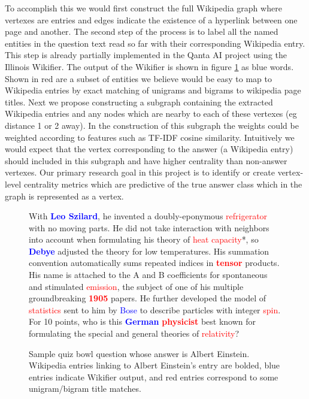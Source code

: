 \documentclass[11pt]{article}
\begin{document}
To accomplish this we would first construct the full Wikipedia graph where vertexes are entries and edges indicate the existence of a hyperlink between one page and another. The second step of the process is to label all the named entities in the question text read so far with their corresponding Wikipedia entry. This step is already partially implemented in the Qanta AI project\cite{Qanta} using the Illinois Wikifier\cite{RRDA11, ChengRo13}. The output of the Wikifier is shown in figure \ref{qb-question} as blue words. Shown in red are a subset of entities we believe would be easy to map to Wikipedia entries by exact matching of unigrams and bigrams to wikipedia page titles. Next we propose constructing a subgraph containing the extracted Wikipedia entries and any nodes which are nearby to each of these vertexes (eg distance 1 or 2 away). In the construction of this subgraph the weights could be weighted according to features such as TF-IDF cosine similarity. Intuitively we would expect that the vertex corresponding to the answer (a Wikipedia entry) should included in this subgraph and have higher centrality than non-answer vertexes. Our primary research goal in this project is to identify or create vertex-level centrality metrics which are predictive of the true answer class which in the graph is represented as a vertex.

\begin{figure}[h]
\caption{Sample quiz bowl question whose answer is Albert Einstein. Wikipedia entries linking to Albert Einstein's entry are bolded, blue entries indicate Wikifier output, and red entries correspond to some unigram/bigram title matches.}
\label{qb-question}
\begin{mdframed}
With \textcolor{blue}{\textbf{Leo Szilard}}, he invented a doubly-eponymous \textcolor{red}{refrigerator} with no moving parts. He did not take interaction with neighbors into account when formulating his theory of \textcolor{red}{heat capacity}*, so \textcolor{blue}{\textbf{Debye}} adjusted the theory for low temperatures. His summation convention automatically sums repeated indices in \textcolor{red}{\textbf{tensor}} products. His name is attached to the A and B coefficients for spontaneous and stimulated \textcolor{red}{emission}, the subject of one of his multiple groundbreaking \textcolor{red}{\textbf{1905}} papers. He further developed the model of \textcolor{red}{statistics} sent to him by \textcolor{blue}{Bose} to describe particles with integer \textcolor{red}{spin}. For 10 points, who is this \textcolor{blue}{\textbf{German}} \textcolor{red}{\textbf{physicist}} best known for formulating the special and general theories of \textcolor{red}{relativity}?
\end{mdframed}
\end{figure}


{}

\end{document}
